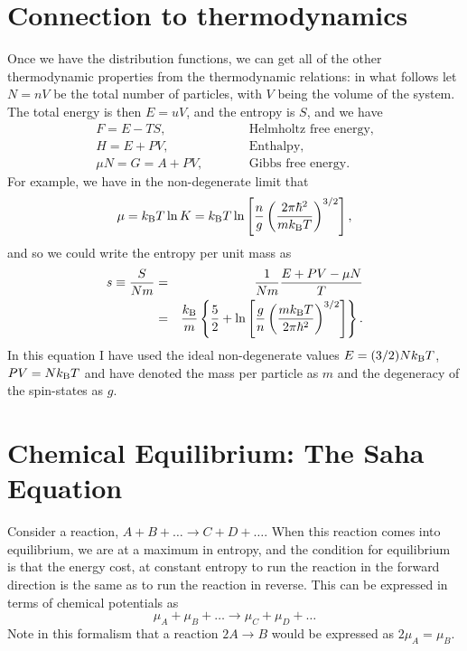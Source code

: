 \section{Connection to thermodynamics}
Once we have the distribution functions, we can get all of the other thermodynamic properties from the thermodynamic relations: in what follows let $N = nV$ be the total number of particles, with $V$ being the volume of the system.  The total energy is then $E = uV$, and the entropy is $S$, and we have
\begin{eqnarray}
F = E - TS, &\qquad& \textrm{Helmholtz free energy,}\\
H = E + PV, &\qquad& \textrm{Enthalpy,}\\
\mu N = G = A + PV, &\qquad& \textrm{Gibbs free energy}.
\end{eqnarray}
For example, we have in the non-degenerate limit that
\begin{equation}\label{e.chem-pot-ideal-gas}
\mu = k_\mathrm{B} T\ln K = k_\mathrm{B} T\ln\left[ \frac{n}{g}\left(\frac{2\pi\hbar^{2}}{mk_\mathrm{B} T}\right)^{3/2}\right],
\end{equation}
and so we could write the entropy per unit mass as
\begin{eqnarray}
s \equiv \frac{S}{Nm} &=& \frac{1}{Nm}\frac{E + PV - \mu N}{T}\nonumber\\
 &=& \frac{k_\mathrm{B} }{m}\left\{ \frac{5}{2} + \ln\left[\frac{g}{n}\left(\frac{mk_\mathrm{B} T}{2\pi\hbar^{2}}\right)^{3/2}\right]\right\}.
\label{e.sacker-tetrode}
 \end{eqnarray}
In this equation I have used the ideal non-degenerate values $E = (3/2) Nk_\mathrm{B} T$, $PV = Nk_\mathrm{B} T$ and have denoted the mass per particle as $m$ and the degeneracy of the spin-states as $g$.

\section{Chemical Equilibrium: The Saha Equation}

Consider a reaction, $A + B + \ldots \to C + D + \ldots$. When this reaction comes into equilibrium, we are at a maximum in entropy, and the condition for equilibrium is that the energy cost, at constant entropy to run the reaction in the forward direction is the same as to run the reaction in reverse. This can be expressed in terms of chemical potentials as
\begin{equation}\label{e.mass-action}
\mu_{A} + \mu_{B} + \ldots \to \mu_{C} + \mu_{D} + \ldots
\end{equation}
Note in this formalism that a reaction $2A \to B$ would be expressed as $2\mu_{A} = \mu_{B}$.

